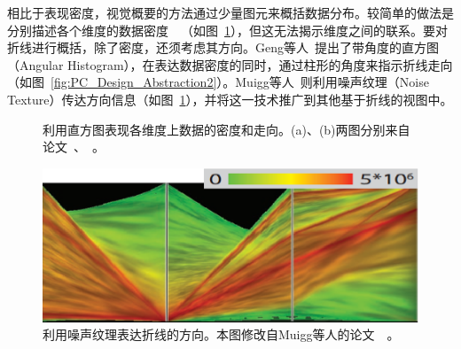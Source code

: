 \documentclass[12pt,twocolumn]{article}
\begin{document}
相比于表现密度，视觉概要的方法通过少量图元来概括数据分布。较简单的做法是分别描述各个维度的数据密度~\citep{hauser2002angular}~\citep{caat2007design}（如图~\ref{fig:PC_Design_Abstraction1}），但这无法揭示维度之间的联系。要对折线进行概括，除了密度，还须考虑其方向。Geng等人~\citep{geng2011angular}提出了带角度的直方图（Angular Histogram），在表达数据密度的同时，通过柱形的角度来指示折线走向（如图~\ref{fig:PC_Design_Abstraction2}）。Muigg等人~\citep{muigg2011visual}则利用噪声纹理（Noise Texture）传达方向信息（如图~\ref{fig:PC_Design_Abstraction1}），并将这一技术推广到其他基于折线的视图中。

\begin{figure}[!htb]
\centering
{}
\caption{利用直方图表现各维度上数据的密度和走向。(a)、(b)两图分别来自论文~\citep{hauser2002angular}、~\citep{geng2011angular}。}
\end{figure}

\begin{figure}[!htb]
\centering
\includegraphics[width=0.9\linewidth]{images/PC_Design_Abstraction3.eps}
\caption{\label{fig:PC_Design_Abstraction1}利用噪声纹理表达折线的方向。本图修改自Muigg等人的论文~\citep{muigg2011visual}~。
}
\end{figure}
\end{document}
